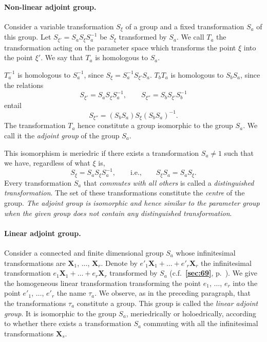 \documentclass[leqno,11pt]{book}
\numberwithin{equation}{chapter}
\theoremstyle{shape1}
\theoremstyle{shapesmall}
\newcommand{\fsref}[1]{{\rm\textsection\textbf{\ref{sec:#1}}}}
\begin{document}
\paragraph{Non-linear adjoint group.}
\label{sec:215}
Consider a variable transformation $S_{\xi}$ of a group and a fixed transformation $S_{a}$ of this group. Let $S_{\xi'}=S_{a}S_{\xi}S_{a}^{-1}$ be $S_{\xi}$ transformed by $S_{a}$. We call $T_{a}$ the transformation acting on the parameter space which transforms the point $\xi$ into the point $\xi'$. We say that $T_{a}$ is homologous to $S_{a}$.

$T^{-1}_{a}$ is homologous to $S^{-1}_{a}$, since $S_{\xi}=S_{a}^{-1}S_{\xi'}S_{a}$. $T_{b}T_{a}$ is homologous to $S_{b}S_{a}$, since the relations
\[
S_{\xi'}=S_{a}S_{\xi}S_{a}^{-1},\qquad S_{\xi''}=S_{b}S_{\xi'}S_{b}^{-1}
\]
entail
\[
S_{\xi''}=(S_{b}S_{a})S_{\xi}(S_{b}S_{a})^{-1}.
\]
The transformation $T_{a}$ hence constitute a group isomorphic to the group $S_{a}$. We call it the \emph{adjoint group} of the group $S_{a}$.

This isomorphism is meriedric if there exists a transformation $S_{a}\neq 1$ such that we have, regardless of what $\xi$ is,
\[
S_{\xi}=S_{a}S_{\xi}S_{a}^{-1},\qquad\text{i.e.,}\qquad S_{\xi}S_{a}=S_{a}S_{\xi}.
\]
Every transformation $S_{a}$ that \emph{commutes with all others} is called a \emph{distinguished transformation}. The set of these transformations constitute the \emph{centre} of the group. \emph{The adjoint group is isomorphic and hence similar to the parameter group when the given group does not contain any distinguished transformation}.

\paragraph{Linear adjoint group.}
\label{sec:216}
Consider a connected and finite dimensional group $S_{a}$ whose infinitesimal transformations are $\mathbf{X}_{1}$, $\dots$, $\mathbf{X}_{r}$. Denote by $e'_{1}\mathbf{X}_{1}+\dots+e'_{r}\mathbf{X}_{r}$ the infinitesimal transformation $e_{1}\mathbf{X}_{1}+\dots+e_{r}\mathbf{X}_{r}$ transformed by $S_{a}$ (c.f.~\fsref{69}, p.~\pageref{sec:69}). We give the homogeneous linear transformation transforming the point $e_{1}$, $\dots$, $e_{r}$ into the point $e'_{1}$, $\dots$, $e'_{r}$ the name $\tau_{a}$. We observe, as in the preceding paragraph, that the transformations $\tau_{a}$ constitute a group. This group is called the \emph{linear adjoint group}. It is isomorphic to the group $S_{a}$, meriedrically or holoedrically, according to whether there exists a transformation $S_{a}$ commuting with all the infinitesimal transformations $\mathbf{X}_{s}$.
\end{document}
